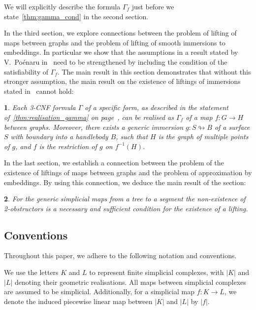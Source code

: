 \documentclass[a4paper,12pt,reqno,oneside]{amsart}
\makeatletter
\theoremstyle{plain}
\theoremstyle{definition}
\theoremstyle{plain}
\newtheorem*{re@theorem}{\re@title}
\newenvironment{retheorem}[1]{%
 \def\re@title{\cref{#1}}%
 \begin{re@theorem}}%
 {\end{re@theorem}}
\newcommand{\from}{\colon}
\makeatother
\begin{document}
We will explicitly describe the formula $\Gamma_f$ just before we state~\cref{thm:gamma_cond} in the
second section.

In the third section, we explore connections between the problem of lifting of maps between graphs
and the problem of lifting of smooth immersions to embeddings. In particular we show that the
assumptions in a result stated by V.~Po\'{e}naru in~\cite{poen_fr} need to be strengthened by
including the condition of the satisfiability of $\Gamma_{f}$. The main result in this section
demonstrates that without this stronger assumption, the main result on the existence of liftings of
immersions stated in~\cite{poen_fr} cannot hold:

\begin{retheorem}{thm:realisation_gamma}
  Each 3-CNF formula $\Gamma$ of a specific form, as described in the statement
  of~\cref{thm:realisation_gamma} on page~\pageref{thm:realisation_gamma}, can be realised
  as $\Gamma_f$ of a map $f \from G \to H$ between graphs. Moreover, there exists a generic
  immersion $g \from S \looparrowright B$ of a surface $S$ with boundary into a handlebody $B$, such
  that $H$ is the graph of multiple points of $g$, and $f$ is the restriction of $g$ on $f^{-1}(H)$.
\end{retheorem}

In the last section, we establish a connection between the problem of the existence of
liftings of maps between graphs and the problem of approximation by embeddings. By using this
connection, we deduce the main result of the section:

\begin{retheorem}{thm:complete_2obs}
  For the generic simplicial maps from a tree to a segment the non-existence of 2-obstructors is a
  necessary and sufficient condition for the existence of a lifting.
\end{retheorem}

\subsection{Conventions}

Throughout this paper, we adhere to the following notation and conventions.

We use the letters $K$ and $L$ to represent finite simplicial complexes, with $|K|$ and $|L|$
denoting their geometric realisations. All maps between simplicial complexes are assumed to be
simplicial. Additionally, for a simplicial map $f \from K \to L$, we denote the induced piecewise
linear map between $|K|$ and $|L|$ by $|f|$.
\end{document}
